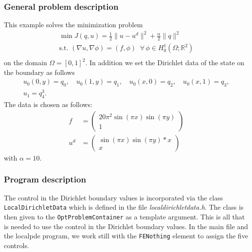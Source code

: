 \subsubsection{General problem description}
This example solves the minimization problem
\begin{gather*}
\min J(q,u) = \frac{1}{2} \|u-u^d\|^2 + \frac{\alpha}{2}\|q\|^2\\
\text{s.t. } (\nabla u,\nabla \phi) = (f,\phi)\;\;\forall\,\phi \in H^1_0(\Omega; \mathbb R^2)\\
\end{gather*}
on the domain $\Omega = [0,1]^2$. In addition we set the Dirichlet data of the state on the boundary as follows
\begin{gather*}
 u_0(0,y) = q_0,\quad u_0(1,y) = q_1,\quad u_0(x,0) = q_2,\quad u_0(x,1) = q_3,\\
 u_1 = q_4^3.
\end{gather*}
The data is chosen as follows:
\begin{align*}
 f &= \left(\begin{matrix}20\pi^2  \sin( \pi x) \sin(\pi y)\\1 \end{matrix}\right)\\
 u^d&= \left(\begin{matrix}\sin( \pi x) \sin(\pi y)*x\\x \end{matrix}\right)
\end{align*}
with $\alpha = 10$.
\subsubsection{Program description}
The control in the Dirichlet boundary values is incorporated via the
class \texttt{LocalDirichletData} which is defined in the
file \textit{localdirichletdata.h}. The class is then given to
the \texttt{OptProblemContainer} as a template argument. This is all that is
needed to use the control in the Dirichlet boundary values. 
In the main file and the localpde program, we work still with the 
\texttt{FE\underline{}Nothing} element to assign the five controls.


